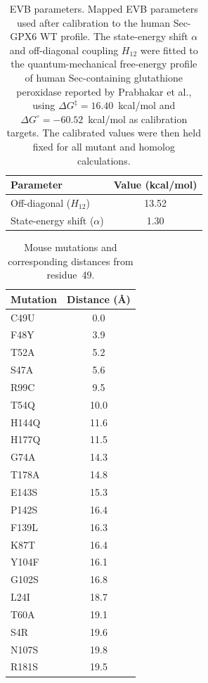 \documentclass[journal=jpcbfk,manuscript=suppinfo]{achemso}
\begin{document}
\begin{table}[htbp]
  \centering
  \begin{tabular}{|l|c|}
    \hline
    \textbf{Parameter} & \textbf{Value (kcal/mol)} \\
    \hline
    Off-diagonal ($H_{12}$) & 13.52 \\
    State-energy shift ($\alpha$) & 1.30 \\
    \hline
  \end{tabular}
  \caption[EVB parameters]{EVB parameters. {\normalfont Mapped EVB parameters used after calibration to the human Sec-GPX6 WT profile. The state-energy shift $\alpha$ and off-diagonal coupling $H_{12}$ were fitted to the quantum-mechanical free-energy profile of human Sec-containing glutathione peroxidase reported by Prabhakar et al., using $\Delta G^{\ddagger}=16.40$~kcal/mol and $\Delta G^{\circ}=-60.52$~kcal/mol as calibration targets. The calibrated values were then held fixed for all mutant and homolog calculations.}}
  \label{tab:evb_parameters}
\end{table}

\begin{table}[htbp]
\centering
\caption[Mouse pathway mutation distances]{Mouse mutations and corresponding distances from residue~49.}
\label{tab:mouse_mutation_distance}
\begin{tabular}{lc}
\toprule
\textbf{Mutation} & \textbf{Distance (\AA)} \\
\midrule
C49U & 0.0 \\
F48Y & 3.9 \\
T52A & 5.2 \\
S47A & 5.6 \\
R99C & 9.5 \\
T54Q & 10.0 \\
H144Q & 11.6 \\
H177Q & 11.5 \\
G74A & 14.3 \\
T178A & 14.8 \\
E143S & 15.3 \\
P142S & 16.4 \\
F139L & 16.3 \\
K87T & 16.4 \\
Y104F & 16.1 \\
G102S & 16.8 \\
L24I & 18.7 \\
T60A & 19.1 \\
S4R & 19.6 \\
N107S & 19.8 \\
R181S & 19.5 \\
\bottomrule
\end{tabular}
\end{table}
\end{document}
